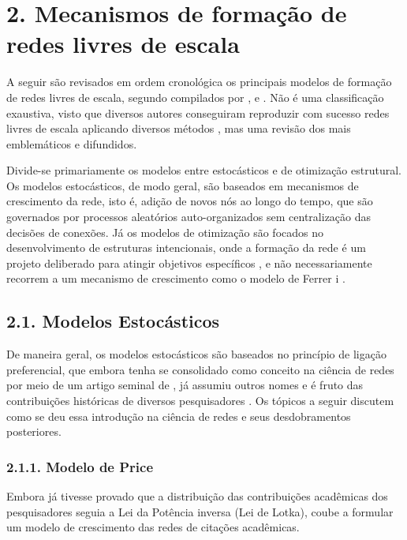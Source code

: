 \documentclass[12pt,oneside,a4paper,brazil,sumario=tradicional]{abntex2}
\begin{document}
\section*{2. Mecanismos de formação de redes livres de escala}
A seguir são revisados em ordem cronológica os principais modelos de formação de redes livres de escala, segundo compilados por \textcite{latora2017}, e \textcite{newman2010}. Não é uma classificação exaustiva, visto que diversos autores conseguiram reproduzir  com sucesso redes livres de escala aplicando diversos métodos \parencite{barabasi2001, caldarelli2002, xu2010, papadopoulos2012}, mas uma revisão dos mais emblemáticos e difundidos.

Divide-se primariamente os modelos entre estocásticos e de otimização estrutural. Os modelos estocásticos, de modo geral, são baseados em mecanismos de crescimento da rede, isto é, adição de novos nós ao longo do tempo, que são governados por processos aleatórios auto-organizados sem centralização das decisões de conexões. Já os modelos de otimização são focados no desenvolvimento de estruturas intencionais, onde a formação da rede é um projeto deliberado para atingir objetivos específicos \parencite{newman2010}, e não necessariamente recorrem a um mecanismo de crescimento como o modelo de Ferrer i \textcite{ferrericancho2003}.

\subsection*{2.1. Modelos Estocásticos}
De maneira geral, os modelos estocásticos são baseados no princípio de ligação preferencial, que embora tenha se consolidado como conceito na ciência de redes por meio de um artigo seminal de \textcite{barabasi1999}, já assumiu outros nomes e é fruto das contribuições históricas de diversos pesquisadores \parencite{eggenberger1923, yule1925, zipf1949, simon1955}. Os tópicos a seguir discutem como se deu essa introdução na ciência de redes e seus desdobramentos posteriores.

\subsubsection*{2.1.1. Modelo de Price}
Embora \textcite{lotka1926} já tivesse provado que a distribuição das contribuições acadêmicas dos pesquisadores seguia a Lei da Potência inversa (Lei de Lotka), coube a \textcite{price1976} formular um modelo de crescimento das redes de citações acadêmicas.
\end{document}
